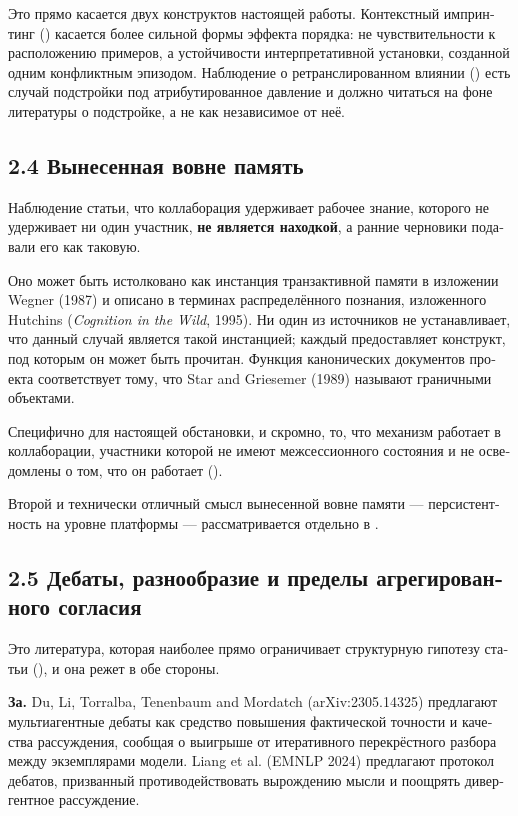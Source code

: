 \begin{russian}
Это прямо касается двух конструктов настоящей работы. Контекстный импринтинг () касается более сильной формы эффекта порядка: не чувствительности к расположению примеров, а устойчивости интерпретативной установки, созданной одним конфликтным эпизодом. Наблюдение о ретранслированном влиянии () есть случай подстройки под атрибутированное давление и должно читаться на фоне литературы о подстройке, а не как независимое от неё.


\subsection*{2.4 Вынесенная вовне память}
\label{sec:ru:2.4}

Наблюдение статьи, что коллаборация удерживает рабочее знание, которого не удерживает ни один участник, \textbf{не является находкой}, а ранние черновики подавали его как таковую.

\gcheck{} Оно может быть истолковано как инстанция транзактивной памяти в изложении Wegner (1987) и описано в терминах распределённого познания, изложенного Hutchins (\emph{Cognition in the Wild}, 1995). Ни один из источников не устанавливает, что данный случай является такой инстанцией; каждый предоставляет конструкт, под которым он может быть прочитан. \gcheck{} Функция канонических документов проекта соответствует тому, что Star and Griesemer (1989) называют граничными объектами.

Специфично для настоящей обстановки, и скромно, то, что механизм работает в коллаборации, участники которой не имеют межсессионного состояния и не осведомлены о том, что он работает ().

Второй и технически отличный смысл вынесенной вовне памяти — персистентность на уровне платформы — рассматривается отдельно в .


\subsection*{2.5 Дебаты, разнообразие и пределы агрегированного согласия}
\label{sec:ru:2.5}

Это литература, которая наиболее прямо ограничивает структурную гипотезу статьи (), и она режет в обе стороны.

\textbf{За.} \gcheck{} Du, Li, Torralba, Tenenbaum and Mordatch (arXiv:2305.14325) предлагают мультиагентные дебаты как средство повышения фактической точности и качества рассуждения, сообщая о выигрыше от итеративного перекрёстного разбора между экземплярами модели. \gcheck{} Liang et al. (EMNLP 2024) предлагают протокол дебатов, призванный противодействовать вырождению мысли и поощрять дивергентное рассуждение.


\end{russian}
